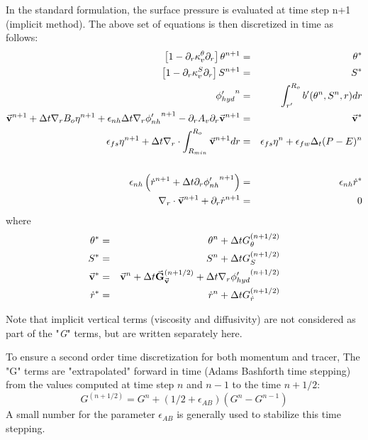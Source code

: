 In the standard formulation, the surface pressure is 
evaluated at time step n+1 (implicit method).
The above set of equations is then discretized in time 
as follows:
\begin{eqnarray}
\left[ 1 - \partial_r \kappa_v^\theta \partial_r \right]
\theta^{n+1} & = & \theta^*
\\
\left[ 1 - \partial_r \kappa_v^S \partial_r \right]
S^{n+1} & = & S^*
\\
{\phi'_{hyd}}^{n} & = & \int_{r'}^{R_o} b'(\theta^{n},S^{n},r) dr
\label{eq-rtd-hyd}
\\
\vec{\bf v} ^{n+1}
+ \Delta t {\bf \nabla}_r B_o {\eta}^{n+1}
+ \epsilon_{nh} \Delta t {\bf \nabla}_r {\phi'_{nh}}^{n+1}
- \partial_r A_v \partial_r \vec{\bf v}^{n+1}
& = &
\vec{\bf v}^*
\label{eq-rtd-hmom}
\\
\epsilon_{fs} {\eta}^{n+1} + \Delta t
{\bf \nabla}_r \cdot \int_{R_{min}}^{R_o} \vec{\bf v}^{n+1} dr
& = & 
    \epsilon_{fs} {\eta}^{n} + \epsilon_{fw} \Delta_t (P-E)^{n} 
\nonumber
\\
\label{eq-rtd-eta}
\\
\epsilon_{nh} \left( \dot{r} ^{n+1}
+ \Delta t \partial_r {\phi'_{nh}} ^{n+1}
\right)
& = & \epsilon_{nh} \dot{r}^*
\label{eq-rtd-rdot}
\\
{\bf \nabla}_r \cdot \vec{\bf v}^{n+1} + \partial_r \dot{r}^{n+1}
& = & 0
\label{eq-rtd-cont}
\end{eqnarray}
where
\begin{eqnarray}
\theta^* & = &
\theta ^{n} + \Delta t G_{\theta} ^{(n+1/2)}
\\
S^* & = &
S ^{n} + \Delta t G_{S} ^{(n+1/2)}
\\
\vec{\bf v}^* & = &
\vec{\bf v}^{n} + \Delta t \vec{\bf G}_{\vec{\bf v}} ^{(n+1/2)}
+ \Delta t  {\bf \nabla}_r {\phi'_{hyd}}^{(n+1/2)}
\\
\dot{r}^* & = &
\dot{r} ^{n} + \Delta t G_{\dot{r}} ^{(n+1/2)}
\end{eqnarray}

Note that implicit vertical terms (viscosity and diffusivity) are 
not considered as part of the "{\it G}" terms, but are 
written separately here.

To ensure a second order time discretization for both 
momentum and tracer,
The "G" terms are "extrapolated" forward in time
(Adams Bashforth time stepping)
from the values computed at time step $n$ and $n-1$
to the time $n+1/2$:
$$G^{(n+1/2)} = G^n + (1/2+\epsilon_{AB}) (G^n - G^{n-1})$$
A small number for the parameter $\epsilon_{AB}$ is generally used 
to stabilize this time stepping.

